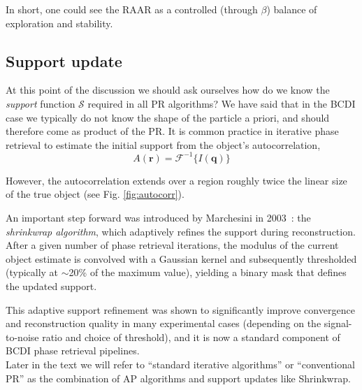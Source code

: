 In short, one could see the RAAR as a controlled (through $\beta$) balance of exploration and stability. 

\subsection{Support update}
At this point of the discussion we should ask ourselves how do we know the \textit{support} function $\mathcal{S}$
required in all PR algorithms? We have said that in the BCDI case we typically do not know the shape of the particle 
a priori, and should therefore come as product of the PR.  
It is common practice in iterative phase retrieval to estimate the initial support 
from the object's autocorrelation,
\begin{equation}
    A(\mathbf{r}) = \mathcal{F}^{-1}\{ I(\mathbf{q}) \}
\end{equation}

However, the autocorrelation extends over a region roughly twice the linear size of the true object (see Fig. \ref{fig:autocorr}). 


An important step forward was introduced by Marchesini in 2003~\cite{Marchesini_shrinkwrap}: 
the \textit{shrinkwrap algorithm}, which adaptively refines the support during reconstruction. 
After a given number of phase retrieval iterations, the modulus of the current object estimate is 
convolved with a Gaussian kernel and subsequently thresholded (typically at $\sim$20\% of the maximum value), 
yielding a binary mask that defines the updated support. 

This adaptive support refinement was shown to significantly improve convergence and reconstruction quality 
in many experimental cases (depending on the signal-to-noise ratio and choice of threshold), and it is now a 
standard component of BCDI phase retrieval pipelines.\\

Later in the text we will refer to ``standard iterative algorithms'' or ``conventional PR'' as the combination of AP 
algorithms and support updates like Shrinkwrap. 



